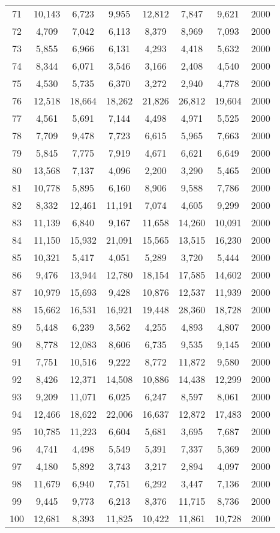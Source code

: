\begin{longtable}{cccccccc}
71  & 10,143 & 6,723  & 9,955  & 12,812 & 7,847  & 9,621  & 2000 \\
72  & 4,709  & 7,042  & 6,113  & 8,379  & 8,969  & 7,093  & 2000 \\
73  & 5,855  & 6,966  & 6,131  & 4,293  & 4,418  & 5,632  & 2000 \\
74  & 8,344  & 6,071  & 3,546  & 3,166  & 2,408  & 4,540  & 2000 \\
75  & 4,530  & 5,735  & 6,370  & 3,272  & 2,940  & 4,778  & 2000 \\
76  & 12,518 & 18,664 & 18,262 & 21,826 & 26,812 & 19,604 & 2000 \\
77  & 4,561  & 5,691  & 7,144  & 4,498  & 4,971  & 5,525  & 2000 \\
78  & 7,709  & 9,478  & 7,723  & 6,615  & 5,965  & 7,663  & 2000 \\
79  & 5,845  & 7,775  & 7,919  & 4,671  & 6,621  & 6,649  & 2000 \\
80  & 13,568 & 7,137  & 4,096  & 2,200  & 3,290  & 5,465  & 2000 \\
81  & 10,778 & 5,895  & 6,160  & 8,906  & 9,588  & 7,786  & 2000 \\
82  & 8,332  & 12,461 & 11,191 & 7,074  & 4,605  & 9,299  & 2000 \\
83  & 11,139 & 6,840  & 9,167  & 11,658 & 14,260 & 10,091 & 2000 \\
84  & 11,150 & 15,932 & 21,091 & 15,565 & 13,515 & 16,230 & 2000 \\
85  & 10,321 & 5,417  & 4,051  & 5,289  & 3,720  & 5,444  & 2000 \\
86  & 9,476  & 13,944 & 12,780 & 18,154 & 17,585 & 14,602 & 2000 \\
87  & 10,979 & 15,693 & 9,428  & 10,876 & 12,537 & 11,939 & 2000 \\
88  & 15,662 & 16,531 & 16,921 & 19,448 & 28,360 & 18,728 & 2000 \\
89  & 5,448  & 6,239  & 3,562  & 4,255  & 4,893  & 4,807  & 2000 \\
90  & 8,778  & 12,083 & 8,606  & 6,735  & 9,535  & 9,145  & 2000 \\
91  & 7,751  & 10,516 & 9,222  & 8,772  & 11,872 & 9,580  & 2000 \\
92  & 8,426  & 12,371 & 14,508 & 10,886 & 14,438 & 12,299 & 2000 \\
93  & 9,209  & 11,071 & 6,025  & 6,247  & 8,597  & 8,061  & 2000 \\
94  & 12,466 & 18,622 & 22,006 & 16,637 & 12,872 & 17,483 & 2000 \\
95  & 10,785 & 11,223 & 6,604  & 5,681  & 3,695  & 7,687  & 2000 \\
96  & 4,741  & 4,498  & 5,549  & 5,391  & 7,337  & 5,369  & 2000 \\
97  & 4,180  & 5,892  & 3,743  & 3,217  & 2,894  & 4,097  & 2000 \\
98  & 11,679 & 6,940  & 7,751  & 6,292  & 3,447  & 7,136  & 2000 \\
99  & 9,445  & 9,773  & 6,213  & 8,376  & 11,715 & 8,736  & 2000 \\
100 & 12,681 & 8,393  & 11,825 & 10,422 & 11,861 & 10,728 & 2000 \\ \hline
\end{longtable}
